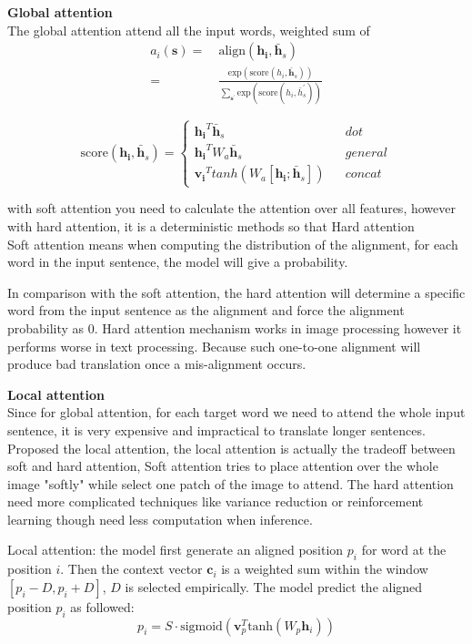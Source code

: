\cite{bahdanau2014neural}
\textbf{Global attention} \\
The global attention attend all the input words, weighted sum of 
\begin{align}
a_i(\bm{s}) = & \ \text{align}(\bm{h_i}, \bar{\bm{h}}_s) \\
= & \ \frac{\text{exp}(\text{score}(h_i, \bar{\bm{h}}_s))}{\sum_{\bm{s}^{\prime}} \text{exp}(\text{score}(h_i, \bar{h}_s^{\prime}))}
\end{align}

\begin{equation}
\text{score}(\bm{h_i}, \bar{\bm{h}}_s)=\left\{
\begin{array}{lcl}
{\bm{h_i}}^T \bar{\bm{h}}_s & & dot\\
{\bm{h_i}}^T W_a \bar{\bm{h}}_s & & general\\
{\bm{v_i}}^T tanh(W_a[\bm{h_i}; \bar{\bm{h}}_s]) & & concat
\end{array} \right.
\end{equation}

with soft attention you need to calculate the attention over all features, however with hard attention, it is a deterministic methods so that 
Hard attention \\
Soft attention means when computing the distribution of the alignment, for each word in the input sentence, the model will give a probability.

In comparison with the soft attention, the hard attention will determine a specific word from the input sentence as the alignment and force the alignment probability as ${0}$.  Hard attention mechanism works in image processing however it performs worse in text processing. Because such one-to-one alignment will produce bad translation once a mis-alignment occurs. \cite{luong2015effective} 


\textbf{Local attention }\\
Since for global attention, for each target word we need to attend the whole input sentence, it is very expensive and impractical to translate longer sentences. Proposed the local attention, the local attention is actually the  tradeoff between soft and hard attention, Soft attention tries to place attention over the whole image "softly" while select one patch of the image to attend. The hard attention need more complicated techniques like variance reduction or reinforcement learning though need less computation when inference.

Local attention: the model first generate an aligned position ${p_i}$ for word at the position ${i}$. Then the context vector ${\bm{c}_i}$ is a weighted sum within the window ${[p_i-D, p_i+D]}$, ${D}$ is selected empirically. The model predict the aligned  position ${p_i}$ as followed:
\[ p_i = S \cdot \text{sigmoid}(\bm{v}_p^T \text{tanh}(W_p \bm{h}_i))\]

